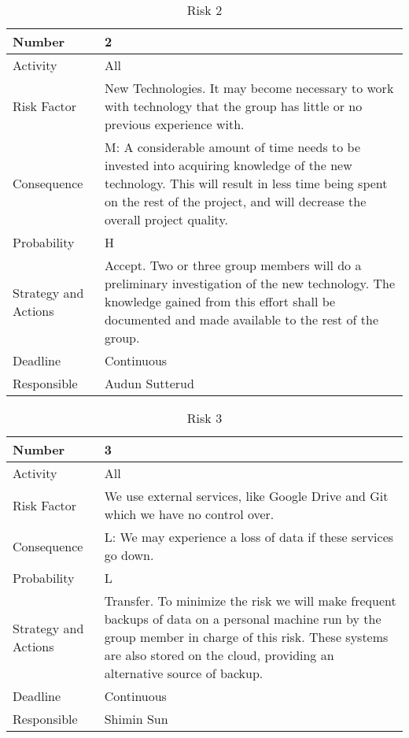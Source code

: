 \documentclass[../document.tex]{subfiles}
\begin{document}
\begin{table}[H]
\caption{Risk 2}
\begin{tabularx}{\textwidth}{|l|X|}
\hline
Number
&2
\\ \hline Activity
&All
\\ \hline Risk Factor
&New Technologies. It may become necessary to work with technology that the group has little or no previous experience with.
\\ \hline Consequence
&M: A considerable amount of time needs to be invested into acquiring knowledge of the new technology. This will result in less time being spent on the rest of the project, and will decrease the overall project quality.
\\ \hline Probability
&H
\\ \hline Strategy and Actions
&Accept. Two or three group members will do a preliminary investigation of the new technology. The knowledge gained from this effort shall be documented and made available to the rest of the group.
\\ \hline Deadline
&Continuous
\\ \hline Responsible
&Audun Sutterud
\\ \hline 
\end{tabularx}
\end{table}

\begin{table}[H]
\caption{Risk 3}
\begin{tabularx}{\textwidth}{|l|X|}
\hline
Number
&3
\\ \hline Activity
&All
\\ \hline Risk Factor
&We use external services, like Google Drive and Git which we have no control over.
\\ \hline Consequence
&L: We may experience a loss of data if these services go down.
\\ \hline Probability
&L
\\ \hline Strategy and Actions
&Transfer. To minimize the risk we will make frequent backups of data on a personal machine run by the group member in charge of this risk. These systems are also stored on the cloud, providing an alternative source of backup.
\\ \hline Deadline
&Continuous
\\ \hline Responsible
&Shimin Sun
\\ \hline 
\end{tabularx}
\end{table}
\end{document}
